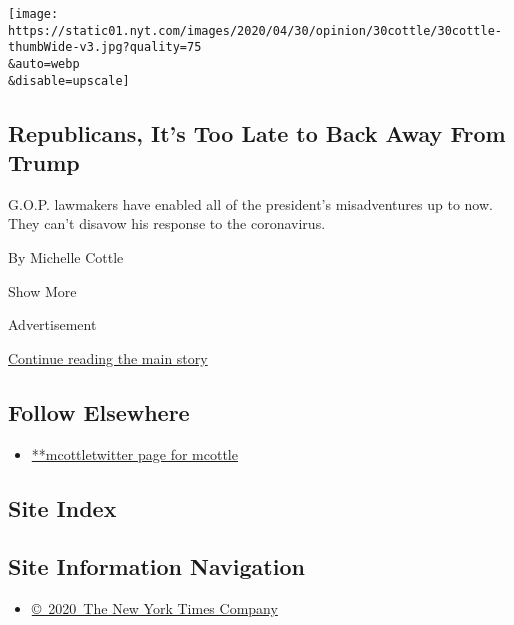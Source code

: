 \begin{enumerate}
  \texttt{[image: https://static01.nyt.com/images/2020/04/30/opinion/30cottle/30cottle-thumbWide-v3.jpg?quality=75\\\&auto=webp\\\&disable=upscale]}

  \hypertarget{republicans-its-too-late-to-back-away-from-trump}{%
  \subsection{Republicans, It's Too Late to Back Away From
  Trump}\label{republicans-its-too-late-to-back-away-from-trump}}

  G.O.P. lawmakers have enabled all of the president's misadventures up
  to now. They can't disavow his response to the coronavirus.

  By Michelle Cottle
\end{enumerate}

Show More

Advertisement

\protect\hyperlink{after-mid2}{Continue reading the main story}

\hypertarget{follow-elsewhere}{%
\subsection{Follow Elsewhere}\label{follow-elsewhere}}

\begin{itemize}
\tightlist
\item
  \href{https://twitter.com/mcottle}{**mcottletwitter page for mcottle}
\end{itemize}

\hypertarget{site-index}{%
\subsection{Site Index}\label{site-index}}

\hypertarget{site-information-navigation}{%
\subsection{Site Information
Navigation}\label{site-information-navigation}}

\begin{itemize}
\tightlist
\item
  \href{https://help.nytimes.com/hc/en-us/articles/115014792127-Copyright-notice}{©~2020~The
  New York Times Company}
\end{itemize}

